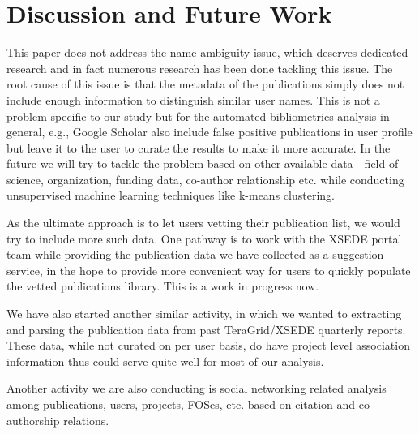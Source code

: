 \section{Discussion and Future Work}

This paper does not address the name ambiguity issue, which deserves dedicated research and in fact numerous research has been done tackling this issue. The root cause of this issue is that the metadata of the publications simply does not include enough information to distinguish similar user names. This is not a problem specific to our study but for the automated bibliometrics analysis in general, e.g., Google Scholar also include false positive publications in user profile but leave it to the user to curate the results to make it more accurate. In the future we will try to tackle the problem based on other available data - field of science, organization, funding data, co-author relationship etc. while conducting unsupervised machine learning techniques like k-means clustering.

As the ultimate approach is to let users vetting their publication list, we would try to include more such data. One pathway is to work with the XSEDE portal team while providing the publication data we have collected as a suggestion service, in the hope to provide more convenient way for users to quickly populate the vetted publications library. This is a work in progress now.

We have also started another similar activity, in which we wanted to extracting and parsing the publication data from past TeraGrid/XSEDE quarterly reports. These data, while not curated on per user basis, do have project level association information thus could serve quite well for most of our analysis.

Another activity we are also conducting is social networking related analysis among publications, users, projects, FOSes, etc. based on citation and co-authorship relations.

